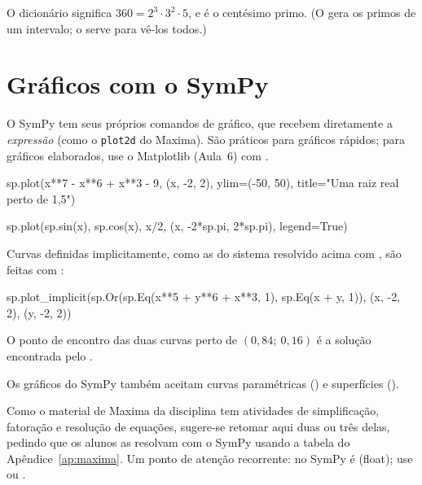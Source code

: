 O dicionário  significa $360=2^3\cdot3^2\cdot5$, e  é o centésimo primo.
(O  gera os primos de um intervalo; o  serve para vê-los todos.)

\section{Gráficos com o SymPy}

O SymPy tem seus próprios comandos de gráfico, que recebem diretamente a \emph{expressão} (como o
\texttt{plot2d} do Maxima). São práticos para gráficos rápidos; para gráficos elaborados, use o Matplotlib
(Aula~6) com .

\begin{entrada}
sp.plot(x**7 - x**6 + x**3 - 9, (x, -2, 2), ylim=(-50, 50), title="Uma raiz real perto de 1,5")
\end{entrada}

\begin{entrada}
sp.plot(sp.sin(x), sp.cos(x), x/2, (x, -2*sp.pi, 2*sp.pi), legend=True)
\end{entrada}

Curvas definidas implicitamente, como as do sistema resolvido acima com , são feitas com
:

\begin{entrada}
sp.plot_implicit(sp.Or(sp.Eq(x**5 + y**6 + x**3, 1), sp.Eq(x + y, 1)), (x, -2, 2), (y, -2, 2))
\end{entrada}

O ponto de encontro das duas curvas perto de $(0{,}84;\ 0{,}16)$ é a solução encontrada pelo .

\begin{observacao}
Os gráficos do SymPy também aceitam curvas paramétricas () e superfícies
().
\end{observacao}

\begin{professor}
Como o material de Maxima da disciplina tem atividades de simplificação, fatoração e resolução de equações,
sugere-se retomar aqui duas ou três delas, pedindo que os alunos as resolvam com o SymPy usando a tabela do
Apêndice~\ref{ap:maxima}. Um ponto de atenção recorrente:  no SymPy é  (float); use
 ou .
\end{professor}

